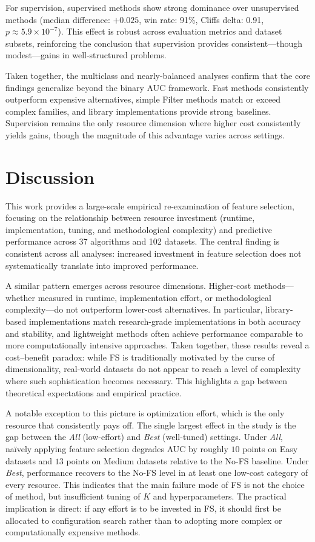 \documentclass[preprint,12pt,authoryear]{elsarticle}
\begin{document}
{For supervision, supervised methods show strong dominance over unsupervised methods (median difference: $+0.025$, win rate: 91\%, Cliffs delta: 0.91, $p \approx 5.9 \times 10^{-7}$). This effect is robust across evaluation metrics and dataset subsets, reinforcing the conclusion that supervision provides consistent—though modest—gains in well-structured problems.

Taken together, the multiclass and nearly-balanced analyses confirm that the core findings generalize beyond the binary AUC framework. Fast methods consistently outperform expensive alternatives, simple Filter methods match or exceed complex families, and library implementations provide strong baselines. Supervision remains the only resource dimension where higher cost consistently yields gains, though the magnitude of this advantage varies across settings. 

\section{Discussion}\label{sec:discussion}
This work provides a large-scale empirical re-examination of feature selection, focusing on the relationship between resource investment (runtime, implementation, tuning, and methodological complexity) and predictive performance across 37 algorithms and 102 datasets. The central finding is consistent across all analyses: increased investment in feature selection does not systematically translate into improved performance.

A similar pattern emerges across resource dimensions. Higher-cost methods—whether measured in runtime, implementation effort, or methodological complexity—do not outperform lower-cost alternatives. In particular, library-based implementations match research-grade implementations in both accuracy and stability, and lightweight methods often achieve performance comparable to more computationally intensive approaches. Taken together, these results reveal a cost–benefit paradox: while FS is traditionally motivated by the curse of dimensionality, real-world datasets do not appear to reach a level of complexity where such sophistication becomes necessary. This highlights a gap between theoretical expectations and empirical practice.

A notable exception to this picture is optimization effort, which is the only resource that consistently pays off. The single largest effect in the study is the gap between the \emph{All} (low-effort) and \emph{Best} (well-tuned) settings. Under \emph{All}, naïvely applying feature selection degrades AUC by roughly $10$ points on Easy datasets and $13$ points on Medium datasets relative to the No-FS baseline. Under \emph{Best}, performance recovers to the No-FS level in at least one low-cost category of every resource. This indicates that the main failure mode of FS is not the choice of method, but insufficient tuning of $K$ and hyperparameters. The practical implication is direct: if any effort is to be invested in FS, it should first be allocated to configuration search rather than to adopting more complex or computationally expensive methods.

}
\end{document}

